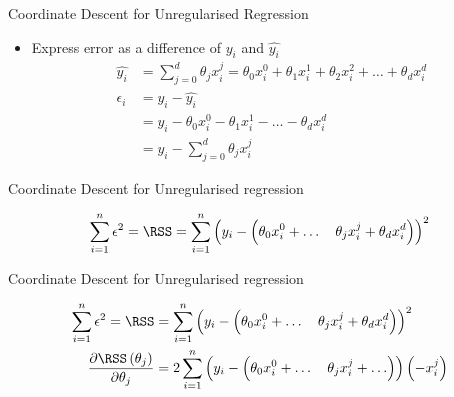 \documentclass{beamer}
\begin{document}
%


\begin{frame}{Coordinate Descent for Unregularised Regression}

\begin{itemize}[<+->]
	
	
	
	
	
	\item Express error as a difference of $y_{i}$ and $\hat{y_{i}}$
	\begin{align}
	\hat{y_i} &= \sum_{j=0}^{d} \theta_{j}x^{j}_{i} = \theta_{0}x_{i}^{0} + \theta_{1}x_{i}^{1} +\theta_{2}x_{i}^{2} + \ldots + \theta_{d}x_{i}^{d}  \\
	\epsilon_{i} &= y_{i} - \hat{y_{i}}\\
	&= y_{i} - \theta_{0}x_{i}^{0} - \theta_{1}x_{i}^{1} - \ldots - \theta_{d}x_{i}^{d}\\
	&= y_{i} - \sum_{j=0}^{d} \theta_{j}x_{i}^{j}
	\end{align}
	
	
	
\end{itemize}


\end{frame}



\begin{frame}{Coordinate Descent for Unregularised regression}

\begin{align*}
\sum_{i=1}^{n}  \epsilon^{2}=\RSS &=\sum_{i=1}^{n}\left(y_{i}-\left(\theta_{0}x_{i}^{0}+\ldots \quad \theta_{j} x_{i}^{j}+\theta_{d} x_{i}^{d}\right)\right)^{2}\\
\end{align*}
\end{frame}

\begin{frame}{Coordinate Descent for Unregularised regression}

\begin{align*}
\sum_{i=1}^{n}  \epsilon^{2}=\RSS &=\sum_{i=1}^{n}\left(y_{i}-\left(\theta_{0}x_{i}^{0}+\ldots \quad \theta_{j} x_{i}^{j}+\theta_{d} x_{i}^{d}\right)\right)^{2}\\
\frac{\partial \RSS\left(\theta_{j}\right)}{\partial \theta_{j}}&= 2 \sum_{i=1}^{n}\left(y_{i}-\left(\theta_{0}x_{i}^{0}+\ldots \quad \theta_{j} x_{i}^{j}+\ldots \right)\right)\left(-x_{i}^{j}\right)\\
\end{align*}
\end{frame}
\end{document}
